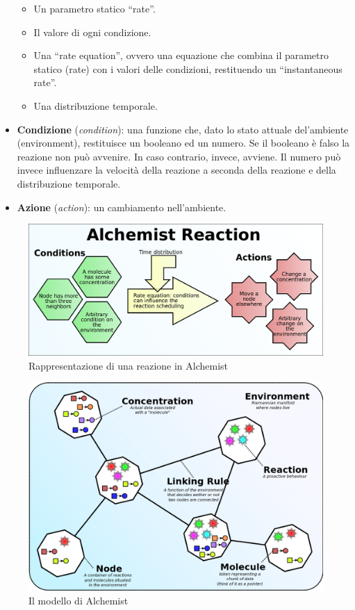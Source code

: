 \documentclass[12pt,a4paper,openright,twoside]{book}
\begin{document}
\begin{itemize}
    \begin{itemize}
        \item Un parametro statico ``rate''.
        \item Il valore di ogni condizione.
        \item Una ``rate equation'', ovvero una equazione che combina il parametro statico (rate) con i valori delle condizioni, restituendo un ``instantaneous rate''.
        \item Una distribuzione temporale.
    \end{itemize}
    \item \textbf{Condizione} (\textit{condition}): una funzione che, dato lo stato attuale del'ambiente (environment), restituisce un booleano ed un numero. Se il booleano è falso la reazione non può avvenire. In caso contrario, invece, avviene. Il numero può invece influenzare la velocità della reazione a seconda della reazione e della distribuzione temporale.
    \item \textbf{Azione} (\textit{action}): un cambiamento nell'ambiente.
\end{itemize}

\begin{figure}[ht]
    \centering
    \includegraphics[width=.8\linewidth]{figures/alchemistReaction.png}
    \caption{Rappresentazione di una reazione in Alchemist}\label{fig:reactionAlchemist}
\end{figure}
\begin{figure}[ht]
    \centering
    \includegraphics[width=.8\linewidth]{figures/alchemistModel.png}
    \caption{Il modello di Alchemist}\label{fig:rmodelAlchemist}
\end{figure}
\clearpage
\end{document}
